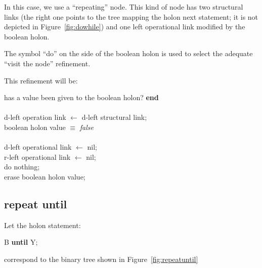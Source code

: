 \documentclass[openany,nobib]{tufte-book}
\newcommand{\kw}[1]{{\bf #1}}
\begin{document}
In this case, we use a ``repeating'' node. This kind of node has two structural
links (the right one points to the tree mapping the holon next statement; it is
not depicted in Figure~\ref{fig:dowhile}) and one left operational link
modified by the boolean holon.

The symbol ``do'' on the side of the boolean holon is used to select the
adequate ``visit the node'' refinement.

This refinement will be:

\smallskip

\noindent\-\hspace{0.4cm}\kw{datatest} has a value been given to the boolean
holon? \kw{end}
\\
\noindent\-\hspace{0.4cm}\kw{begin} \\
\noindent\-\hspace{0.7cm}d-left operation link $\gets$ d-left structural
link;\\
\noindent\-\hspace{0.7cm}\kw{if} boolean holon value $\equiv$ {\it false}\\
\noindent\-\hspace{0.9cm}\kw{then} \\
\noindent\-\hspace{1.1cm}d-left operational link $\gets$ nil;\\
\noindent\-\hspace{1.1cm}r-left operational link $\gets$ nil;\\
\noindent\-\hspace{0.9cm}\kw{else} do nothing; \\
\noindent\-\hspace{0.7cm}erase boolean holon value;\\
\noindent\-\hspace{0.4cm}\kw{end}

\subsection{repeat until}

Let the holon statement:

\smallskip

\noindent\-\hspace{0.7cm}\kw{repeat} B \kw{until} Y;

\smallskip

\noindent correspond to the binary tree shown in Figure~\ref{fig:repeatuntil}
\end{document}
